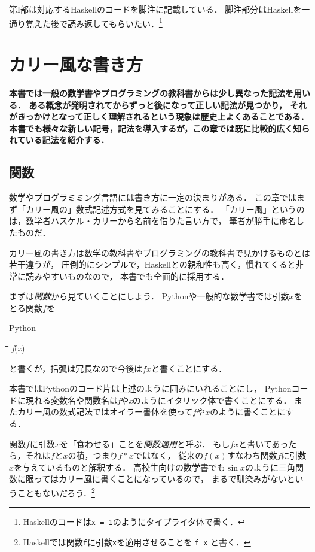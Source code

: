 \documentclass[twocolumn]{jsbook}
\newcommand{\programminglanguage}[1]{\textsf{#1}}
\newcommand{\haskell}{\programminglanguage{Haskell}}
\newcommand{\python}{\programminglanguage{Python}}
\newcommand{\code}[1]{\texttt{#1}}
\newcommand{\keyword}[1]{{\emph{#1}}}
\newenvironment{pythoncode}{\begin{itembox}[r]{\python}}{\end{itembox}}
\newenvironment{pythontab}{\begin{tabbing}\hspace*{1em}\=\hspace*{1em}\=\hspace*{1em}\=\hspace*{1em}\=\kill}{\end{tabbing}}
\newenvironment{leader}{\begingroup\bf}{\endgroup}
\newcommand{\pthnId}[1]{\textit{#1}}
\begin{document}
第I部は対応する\haskell のコードを脚注に記載している．
脚注部分は\haskell を一通り覚えた後で読み返してもらいたい．\footnote{\haskell のコードは\code{x = 1}のようにタイプライタ体で書く．}


\chapter{カリー風な書き方}

\begin{leader}
本書では一般の数学書やプログラミングの教科書からは少し異なった記法を用いる．
ある概念が発明されてからずっと後になって正しい記法が見つかり，
それがきっかけとなって正しく理解されるという現象は歴史上よくあることである．
本書でも様々な新しい記号，記法を導入するが，この章では既に比較的広く知られている記法を紹介する．
\end{leader}

\section{関数}

数学やプログラミミング言語には書き方に一定の決まりがある．
この章ではまず「カリー風の」数式記述方式を見てみることにする．
「カリー風」というのは，数学者ハスケル・カリーから名前を借りた言い方で，
筆者が勝手に命名したものだ．

カリー風の書き方は数学の教科書やプログラミングの教科書で見かけるものとは若干違うが，
圧倒的にシンプルで，\haskell との親和性も高く，慣れてくると非常に読みやすいものなので，
本書でも全面的に採用する．

まずは\keyword{関数}から見ていくことにしよう．
\python や一般的な数学書では引数$x$をとる関数$f$を
\begin{pythoncode}
\begin{pythontab}
\pthnId{f}(\pthnId{x})
\end{pythontab}
\end{pythoncode}
と書くが，括弧は冗長なので今後は$fx$と書くことにする．

本書では\python のコード片は上述のように囲みにいれることにし，
\python コードに現れる変数名や関数名は\pthnId{f}や\pthnId{x}のようにイタリック体で書くことにする．
またカリー風の数式記法ではオイラー書体を使って$f$や$x$のように書くことにする．

関数$f$に引数$x$を「食わせる」ことを\keyword{関数適用}と呼ぶ．
もし$fx$と書いてあったら，それは$f$と$x$の積，つまり$f*x$ではなく，
従来の$f\left(x\right)$すなわち関数$f$に引数$x$を与えているものと解釈する．
高校生向けの数学書でも$\sin x$のように三角関数に限ってはカリー風に書くことになっているので，
まるで馴染みがないということもないだろう．\footnote{\haskell では関数\code{f}に引数\code{x}を適用させることを \code{f x} と書く．}
\end{document}
